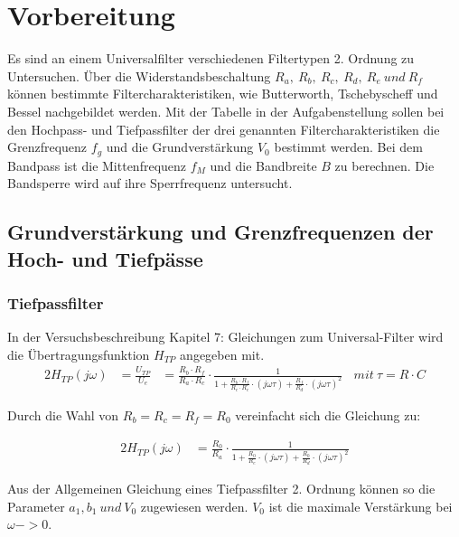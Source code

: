 \section{Vorbereitung}
Es sind an einem Universalfilter verschiedenen Filtertypen 2. Ordnung zu Untersuchen. Über die Widerstandsbeschaltung $R_{a},~R_{b},~R_{c},~R_{d},~R_{e}~und~R_{f}$ können bestimmte Filtercharakteristiken, wie Butterworth, Tschebyscheff und Bessel nachgebildet werden.
Mit der Tabelle \cite{Aufgabenstellung} in der Aufgabenstellung sollen bei den Hochpass- und Tiefpassfilter der drei genannten Filtercharakteristiken die Grenzfrequenz $f_{g}$ und die Grundverstärkung $V_{0}$ bestimmt werden.
Bei dem Bandpass ist die Mittenfrequenz $f_{M}$ und die Bandbreite $B$ zu berechnen.
Die Bandsperre wird auf ihre Sperrfrequenz untersucht.



\subsection{Grundverstärkung und Grenzfrequenzen der Hoch- und Tiefpässe}

\subsubsection{Tiefpassfilter}

In der Versuchsbeschreibung \cite{Aufgabenstellung} Kapitel 7: Gleichungen zum Universal-Filter wird die Übertragungsfunktion $H_{TP}$ angegeben mit.\\

\begin{alignat}{2}
H_{TP} (j \omega)&= \frac{U_{TP}}{U_{e}} &= \frac{R_{b} \cdot R_{f}}{R_{a} \cdot R_{c}} \cdot \frac{1}{1+\frac{R_{b} \cdot R_{f}}{R_{c} \cdot R_{e}} \cdot  \left(j \omega \tau \right) + \frac{R_{f}}{R_{d}} \cdot \left ( j \omega \tau \right)^2}~~~~ mit ~\tau = R \cdot C
\end{alignat}

\noindent Durch die Wahl von $R_{b} = R_{c} = R_{f} = R_{0}$ vereinfacht sich die Gleichung zu:

\begin{alignat}{2}
H_{TP} (j \omega) &= \frac{R_{0}}{R_{a}} \cdot \frac{1}{1+\frac{R_{0}}{R_{e}} \cdot  \left(j \omega \tau \right) + \frac{R_{0}}{R_{d}} \cdot \left ( j \omega \tau \right)^2}
\end{alignat}

\noindent Aus der Allgemeinen Gleichung eines Tiefpassfilter 2. Ordnung können so die Parameter $a_{1}, b_{1}~und~V_{0}$ zugewiesen werden. $V_{0}$ ist die maximale Verstärkung bei $\omega -> 0$.

